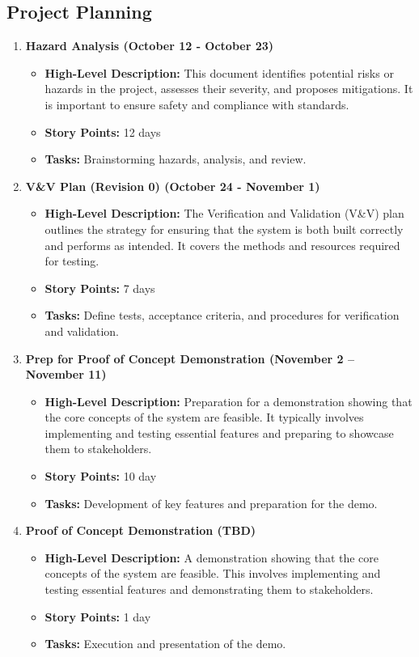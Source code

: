 \documentclass[12pt]{article}
\begin{document}
\subsection{Project Planning}
\begin{enumerate}
    \item \textbf{Hazard Analysis (October 12 - October 23)}
    \begin{itemize}
        \item \textbf{High-Level Description:} This document identifies potential risks or hazards in the project, assesses their severity,
         and proposes mitigations. It is important to ensure safety and compliance with standards.
        \item \textbf{Story Points:} 12 days
        \item \textbf{Tasks:} Brainstorming hazards, analysis, and review.
    \end{itemize}

    \item \textbf{V\&V Plan (Revision 0) (October 24 - November 1)}
    \begin{itemize}
        \item \textbf{High-Level Description:} The Verification and Validation (V\&V) plan outlines the strategy for ensuring that the system
         is both built correctly and performs as intended. It covers the methods and resources required for testing.
        \item \textbf{Story Points:} 7 days
        \item \textbf{Tasks:} Define tests, acceptance criteria, and procedures for verification and validation.
    \end{itemize}

    \item \textbf{Prep for Proof of Concept Demonstration (November 2 – November 11)}
    \begin{itemize}
        \item \textbf{High-Level Description:} Preparation for a demonstration showing that the core concepts of the system are feasible. 
        It typically involves implementing and testing essential features and preparing to showcase them to stakeholders.
        \item \textbf{Story Points:} 10 day
        \item \textbf{Tasks:} Development of key features and preparation for the demo.
    \end{itemize}

    \item \textbf{Proof of Concept Demonstration (TBD)}
    \begin{itemize}
        \item \textbf{High-Level Description:} A demonstration showing that the core concepts of the system are feasible. This involves 
        implementing and testing essential features and demonstrating them to stakeholders.
        \item \textbf{Story Points:} 1 day
        \item \textbf{Tasks:} Execution and presentation of the demo.
    \end{itemize}


\end{enumerate}
\end{document}
